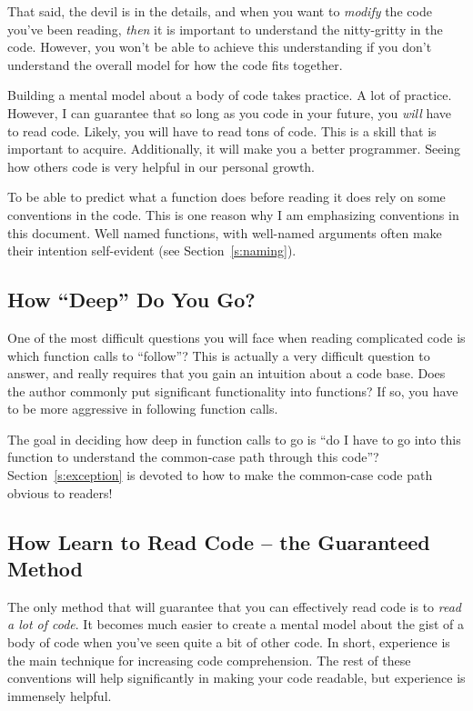 \documentclass[11pt,onecolumn]{article}
\begin{document}
That said, the devil is in the details, and when you want to {\em
  modify} the code you've been reading, {\em then} it is important to
understand the nitty-gritty in the code.  However, you won't be able
to achieve this understanding if you don't understand the overall
model for how the code fits together.

Building a mental model about a body of code takes practice.  A lot of
practice.  However, I can guarantee that so long as you code in your
future, you {\em will} have to read code.  Likely, you will have to
read tons of code.  This is a skill that is important to acquire.
Additionally, it will make you a better programmer.  Seeing how others
code is very helpful in our personal growth.

To be able to predict what a function does before reading it does rely
on some conventions in the code.  This is one reason why I am
emphasizing conventions in this document.  Well named functions, with
well-named arguments often make their intention self-evident (see
Section~\ref{s:naming}).

\subsection{How ``Deep'' Do You Go?}

One of the most difficult questions you will face when reading
complicated code is which function calls to ``follow''?  This is
actually a very difficult question to answer, and really requires that
you gain an intuition about a code base.  Does the author commonly put
significant functionality into functions?  If so, you have to be more
aggressive in following function calls.

The goal in deciding how deep in function calls to go is ``do I have
to go into this function to understand the common-case path through
this code''?  Section~\ref{s:exception} is devoted to how to make the
common-case code path obvious to readers!

\subsection{How Learn to Read Code -- the Guaranteed Method}

The only method that will guarantee that you can effectively read code
is to {\em read a lot of code}.  It becomes much easier to create a
mental model about the gist of a body of code when you've seen quite a
bit of other code.  In short, experience is the main technique for
increasing code comprehension.  The rest of these conventions will
help significantly in making your code readable, but experience is
immensely helpful.
\end{document}

